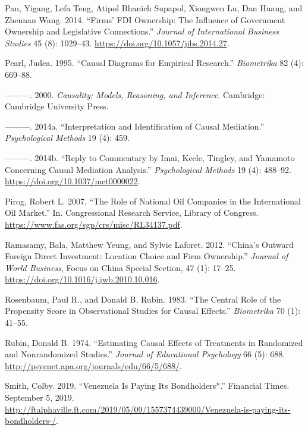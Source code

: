 \documentclass[11pt,]{book}
\begin{document}
\leavevmode\hypertarget{ref-pan_firms_2014}{}%
Pan, Yigang, Lefa Teng, Atipol Bhanich Supapol, Xiongwen Lu, Dan Huang, and Zhennan Wang. 2014. ``Firms' FDI Ownership: The Influence of Government Ownership and Legislative Connections.'' \emph{Journal of International Business Studies} 45 (8): 1029--43. \url{https://doi.org/10.1057/jibs.2014.27}.

\leavevmode\hypertarget{ref-pearl_causal_1995}{}%
Pearl, Judea. 1995. ``Causal Diagrams for Empirical Research.'' \emph{Biometrika} 82 (4): 669--88.

\leavevmode\hypertarget{ref-pearl_causality_2000}{}%
---------. 2000. \emph{Causality: Models, Reasoning, and Inference}. Cambridge: Cambridge University Press.

\leavevmode\hypertarget{ref-pearl_interpretation_2014}{}%
---------. 2014a. ``Interpretation and Identification of Causal Mediation.'' \emph{Psychological Methods} 19 (4): 459.

\leavevmode\hypertarget{ref-pearl_reply_2014}{}%
---------. 2014b. ``Reply to Commentary by Imai, Keele, Tingley, and Yamamoto Concerning Causal Mediation Analysis.'' \emph{Psychological Methods} 19 (4): 488--92. \url{https://doi.org/10.1037/met0000022}.

\leavevmode\hypertarget{ref-pirog_role_2007}{}%
Pirog, Robert L. 2007. ``The Role of National Oil Companies in the International Oil Market.'' In. Congressional Research Service, Library of Congress. \url{https://www.fas.org/sgp/crs/misc/RL34137.pdf}.

\leavevmode\hypertarget{ref-ramasamy_chinas_2012}{}%
Ramasamy, Bala, Matthew Yeung, and Sylvie Laforet. 2012. ``China's Outward Foreign Direct Investment: Location Choice and Firm Ownership.'' \emph{Journal of World Business}, Focus on China Special Section, 47 (1): 17--25. \url{https://doi.org/10.1016/j.jwb.2010.10.016}.

\leavevmode\hypertarget{ref-rosenbaum_central_1983}{}%
Rosenbaum, Paul R., and Donald B. Rubin. 1983. ``The Central Role of the Propensity Score in Observational Studies for Causal Effects.'' \emph{Biometrika} 70 (1): 41--55.

\leavevmode\hypertarget{ref-rubin_estimating_1974}{}%
Rubin, Donald B. 1974. ``Estimating Causal Effects of Treatments in Randomized and Nonrandomized Studies.'' \emph{Journal of Educational Psychology} 66 (5): 688. \url{http://psycnet.apa.org/journals/edu/66/5/688/}.

\leavevmode\hypertarget{ref-smith_venezuela_2019}{}%
Smith, Colby. 2019. ``Venezuela Is Paying Its Bondholders*.'' Financial Times. September 5, 2019. \url{http://ftalphaville.ft.com/2019/05/09/1557374439000/Venezuela-is-paying-its-bondholders-/}.
\end{document}
